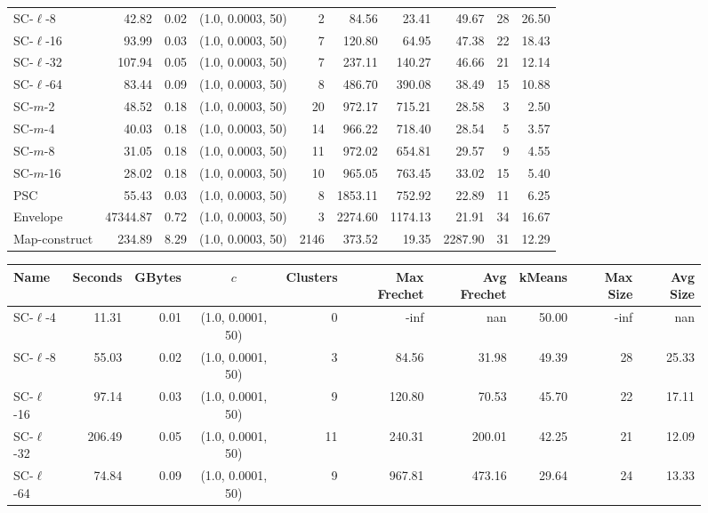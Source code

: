 \begin{figure}
\begin{center}
\begin{minipage}{\textwidth}
{\begin{tabular}{@{}lrrcrrrrrr@{}}
        SC-$\ell$-8 & 42.82 & 0.02 & (1.0, 0.0003, 50) & 2 & 84.56 & 23.41 & 49.67 & 28 & 26.50\\
        SC-$\ell$-16 & 93.99 & 0.03 & (1.0, 0.0003, 50) & 7 & 120.80 & 64.95 & 47.38 & 22 & 18.43\\
        SC-$\ell$-32 & 107.94 & 0.05 & (1.0, 0.0003, 50) & 7 & 237.11 & 140.27 & 46.66 & 21 & 12.14\\
        SC-$\ell$-64 & 83.44 & 0.09 & (1.0, 0.0003, 50) & 8 & 486.70 & 390.08 & 38.49 & 15 & 10.88\\
        SC-$m$-2 & 48.52 & 0.18 & (1.0, 0.0003, 50) & 20 & 972.17 & 715.21 & 28.58 & 3 & 2.50\\
        SC-$m$-4 & 40.03 & 0.18 & (1.0, 0.0003, 50) & 14 & 966.22 & 718.40 & 28.54 & 5 & 3.57\\
        SC-$m$-8 & 31.05 & 0.18 & (1.0, 0.0003, 50) & 11 & 972.02 & 654.81 & 29.57 & 9 & 4.55\\
        SC-$m$-16 & 28.02 & 0.18 & (1.0, 0.0003, 50) & 10 & 965.05 & 763.45 & 33.02 & 15 & 5.40\\
        PSC & 55.43 & 0.03 & (1.0, 0.0003, 50) & 8 & 1853.11 & 752.92 & 22.89 & 11 & 6.25\\
        Envelope & 47344.87 & 0.72 & (1.0, 0.0003, 50) & 3 & 2274.60 & 1174.13 & 21.91 & 34 & 16.67\\
        Map-construct & 234.89 & 8.29 & (1.0, 0.0003, 50) & 2146 & 373.52 & 19.35 & 2287.90 & 31 & 12.29\\
        \bottomrule
    \end{tabular}
    }
    {
    \begin{tabular}{@{}lrrcrrrrrr@{}}
        \toprule
        Name & Seconds & GBytes & $c$ & Clusters & Max Frechet & Avg Frechet & kMeans & Max Size & Avg Size\\
        \midrule
        SC-$\ell$-4 & 11.31 & 0.01 & (1.0, 0.0001, 50) & 0 & -inf & nan & 50.00 & -inf & nan\\
        SC-$\ell$-8 & 55.03 & 0.02 & (1.0, 0.0001, 50) & 3 & 84.56 & 31.98 & 49.39 & 28 & 25.33\\
        SC-$\ell$-16 & 97.14 & 0.03 & (1.0, 0.0001, 50) & 9 & 120.80 & 70.53 & 45.70 & 22 & 17.11\\
        SC-$\ell$-32 & 206.49 & 0.05 & (1.0, 0.0001, 50) & 11 & 240.31 & 200.01 & 42.25 & 21 & 12.09\\
        SC-$\ell$-64 & 74.84 & 0.09 & (1.0, 0.0001, 50) & 9 & 967.81 & 473.16 & 29.64 & 24 & 13.33\\

\end{tabular}}
\end{minipage}
\end{center}
\end{figure}
